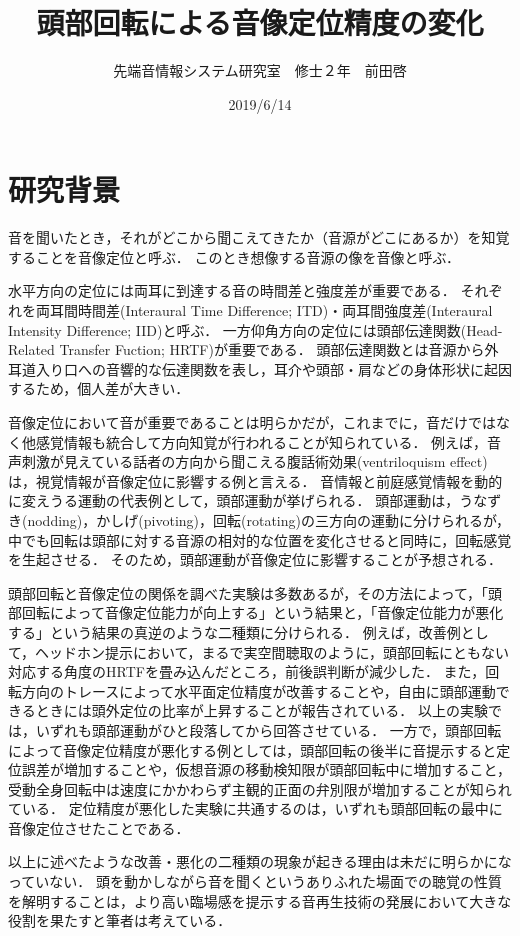 \documentclass[12pt,a4j]{jsarticle}
\title{頭部回転による音像定位精度の変化}
\author{先端音情報システム研究室　修士２年　前田啓}
\date{2019/6/14}
\renewcommand{\ }{\hspace{1zw}}
\begin{document}
\maketitle
\section{研究背景}
音を聞いたとき，それがどこから聞こえてきたか（音源がどこにあるか）を知覚することを音像定位と呼ぶ．
このとき想像する音源の像を音像と呼ぶ．

水平方向の定位には両耳に到達する音の時間差と強度差が重要である．
それぞれを両耳間時間差(Interaural Time Difference; ITD)・両耳間強度差(Interaural Intensity Difference; IID)と呼ぶ．
一方仰角方向の定位には頭部伝達関数(Head-Related Transfer Fuction; HRTF)が重要である．
頭部伝達関数とは音源から外耳道入り口への音響的な伝達関数を表し，耳介や頭部・肩などの身体形状に起因するため，個人差が大きい．

音像定位において音が重要であることは明らかだが，これまでに，音だけではなく他感覚情報も統合して方向知覚が行われることが知られている．
例えば，音声刺激が見えている話者の方向から聞こえる腹話術効果(ventriloquism effect)は，視覚情報が音像定位に影響する例と言える．
音情報と前庭感覚情報を動的に変えうる運動の代表例として，頭部運動が挙げられる．
頭部運動は，うなずき(nodding)，かしげ(pivoting)，回転(rotating)の三方向の運動に分けられるが，中でも回転は頭部に対する音源の相対的な位置を変化させると同時に，回転感覚を生起させる．
そのため，頭部運動が音像定位に影響することが予想される．

頭部回転と音像定位の関係を調べた実験は多数あるが，その方法によって，「頭部回転によって音像定位能力が向上する」という結果と，「音像定位能力が悪化する」という結果の真逆のような二種類に分けられる．
例えば，改善例として，ヘッドホン提示において，まるで実空間聴取のように，頭部回転にともない対応する角度のHRTFを畳み込んだところ，前後誤判断が減少した\cite{Kawaura}．
また，回転方向のトレースによって水平面定位精度が改善すること\cite{Iwaya}や，自由に頭部運動できるときには頭外定位の比率が上昇すること\cite{Brimijoin}が報告されている．
以上の実験では，いずれも頭部運動がひと段落してから回答させている．
一方で，頭部回転によって音像定位精度が悪化する例としては，頭部回転の後半に音提示すると定位誤差が増加すること\cite{Cooper}や，仮想音源の移動検知限が頭部回転中に増加すること\cite{Honda}，受動全身回転中は速度にかかわらず主観的正面の弁別限が増加すること\cite{Masumi}\cite{Tsuno}が知られている．
定位精度が悪化した実験に共通するのは，いずれも頭部回転の最中に音像定位させたことである．

以上に述べたような改善・悪化の二種類の現象が起きる理由は未だに明らかになっていない．
頭を動かしながら音を聞くというありふれた場面での聴覚の性質を解明することは，より高い臨場感を提示する音再生技術の発展において大きな役割を果たすと筆者は考えている．
\end{document}
